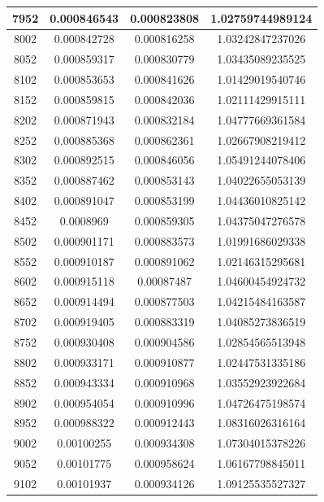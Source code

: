 \documentclass{article}
\begin{document}
\begin{longtable}{|c|c|c|c|}
		7952	&   0.000846543	  & 0.000823808	 &  1.02759744989124   \\ \hline
		8002	&   0.000842728	  & 0.000816258	 &  1.03242847237026   \\ \hline
		8052	&   0.000859317	  & 0.000830779	 &  1.03435089235525   \\ \hline
		8102	&   0.000853653	  & 0.000841626	 &  1.01429019540746   \\ \hline
		8152	&   0.000859815	  & 0.000842036	 &  1.02111429915111   \\ \hline
		8202	&   0.000871943	  & 0.000832184	 &  1.04777669361584   \\ \hline
		8252	&   0.000885368	  & 0.000862361	 &  1.02667908219412   \\ \hline
		8302	&   0.000892515	  & 0.000846056	 &  1.05491244078406   \\ \hline
		8352	&   0.000887462	  & 0.000853143	 &  1.04022655053139   \\ \hline
		8402	&   0.000891047	  & 0.000853199	 &  1.04436010825142   \\ \hline
		8452	&   0.0008969	  & 0.000859305	 &  1.04375047276578   \\ \hline
		8502	&   0.000901171	  & 0.000883573	 &  1.01991686029338   \\ \hline
		8552	&   0.000910187	  & 0.000891062	 &  1.02146315295681   \\ \hline
		8602	&   0.000915118	  & 0.00087487	 &  1.04600454924732   \\ \hline
		8652	&   0.000914494	  & 0.000877503	 &  1.04215484163587   \\ \hline
		8702	&   0.000919405	  & 0.000883319	 &  1.04085273836519   \\ \hline
		8752	&   0.000930408	  & 0.000904586	 &  1.02854565513948   \\ \hline
		8802	&   0.000933171	  & 0.000910877	 &  1.02447531335186   \\ \hline
		8852	&   0.000943334	  & 0.000910968	 &  1.03552923922684   \\ \hline
		8902	&   0.000954054	  & 0.000910996	 &  1.04726475198574   \\ \hline
		8952	&   0.000988322	  & 0.000912443	 &  1.08316026316164   \\ \hline
		9002	&   0.00100255	  & 0.000934308	 &  1.07304015378226   \\ \hline
		9052	&   0.00101775	  & 0.000958624	 &  1.06167798845011   \\ \hline
		9102	&   0.00101937	  & 0.000934126	 &  1.09125535527327   \\ \hline

\end{longtable}
\end{document}
